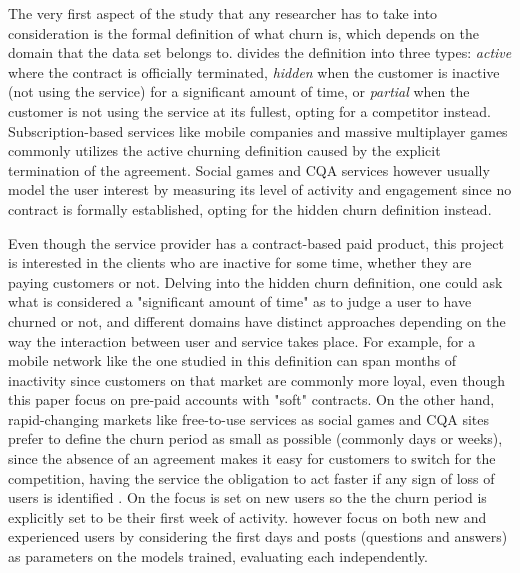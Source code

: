 \documentclass{kththesis}
\begin{document}
The very first aspect of the study that any researcher has to take into consideration is the formal definition of what churn is, which depends on the domain that the data set belongs to. \citep{lazarov2007churn} divides the definition into three types: \emph{active} where the contract is officially terminated, \emph{hidden} when the customer is inactive (not using the service) for a significant amount of time, or \emph{partial} when the customer is not using the service at its fullest, opting for a competitor instead. Subscription-based services like mobile companies \citep{Lu2014}\citep{Hassouna2015} and massive multiplayer games \citep{Borbora2011} commonly utilizes the active churning definition caused by the explicit termination of the agreement. Social games \citep{Runge2014}\citep{Drachen2016RapidPO} and CQA services \citep{Pudipeddi2014}\citep{Dror2012} however usually model the user interest by measuring its level of activity and engagement since no contract is formally established, opting for the hidden churn definition instead. 

Even though the service provider has a contract-based paid product, this project is interested in the clients who are inactive for some time, whether they are paying customers or not. Delving into the hidden churn definition, one could ask what is considered a "significant amount of time" as to judge a user to have churned or not, and different domains have distinct approaches depending on the way the interaction between user and service takes place. For example, for a mobile network like the one studied in \citep{Khan2015} this definition can span months of inactivity since customers on that market are commonly more loyal, even though this paper focus on pre-paid accounts with "soft" contracts. On the other hand, rapid-changing markets like free-to-use services as social games and CQA sites prefer to define the churn period as small as possible (commonly days or weeks), since the absence of an agreement makes it easy for customers to switch for the competition, having the service the obligation to act faster if any sign of loss of users is identified \citep{Khan2015}\citep{Drachen2016RapidPO}. On \citep{Dror2012} the focus is set on new users so the the churn period is explicitly set to be their first week of activity. \citep{Pudipeddi2014} however focus on both new and experienced users by considering the first days and posts (questions and answers) as parameters on the models trained, evaluating each independently.
\end{document}
